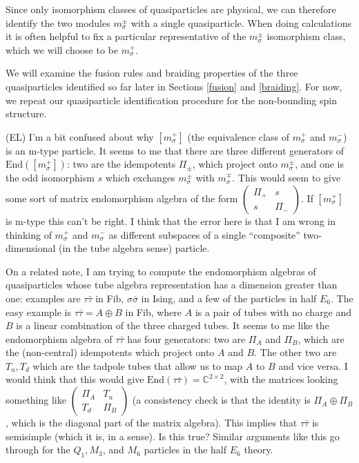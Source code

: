 \documentclass[12pt,a4paper]{article}
\newcommand{\cc}{\mathbb{C}}
\newcommand{\End}{\text{End}}
\newcommand{\ethan}[1]{{\color{amethyst}\footnotesize{(EL) #1}}}
\begin{document}
Since only isomorphism classes of quasiparticles are physical, we can therefore identify the 
two modules $m_\sigma^\pm$ with a single quasiparticle. 
When doing calculations it is often helpful to fix a particular representative of the $m_\sigma^\pm$ 
isomorphism class, which we will choose to be $m_\sigma^+$. 

We will examine the fusion rules and braiding properties of the three quasiparticles identified so 
far later in Sections \ref{fusion} and \ref{braiding}. 
For now, we repeat our quasiparticle identification procedure for the non-bounding spin structure.


\ethan{I'm a bit confused about why $[m^+_\sigma]$ (the equivalence class of $m^+_\sigma$ and 
$m_\sigma^-$) is an m-type particle. 
It seems to me that there are three different generators of $\End([m^+_\sigma])$: 
two are the idempotents $\Pi_\pm$, which project onto $m^\pm_\sigma$, and one is the 
odd isomorphism $s$ which exchanges $m^\pm_\sigma$ with $m^\mp_\sigma$. 
This would seem to give some sort of matrix endomorphism algebra of the form $\begin{pmatrix} \Pi_+ & s \\ s & \Pi_- \end{pmatrix}$. 
If $[m^+_\sigma]$ is m-type this can't be right. 
I think that the error here is that I am wrong in thinking of $m^+_\sigma$ and $m^-_\sigma$ 
as different subspaces of a single ``composite'' two-dimensional (in the tube algebra sense) particle. 

On a related note, I am trying to compute the endomorphism algebras of quasiparticles whose 
tube algebra representation has a dimension greater than one: examples are $\tau\bar\tau$ in 
Fib, $\sigma\bar\sigma$ in Ising, and a few of the particles in half $E_6$. 
The easy example is $\tau\bar\tau = A\oplus B$ in Fib, where $A$ is a pair of tubes with no 
charge and $B$ is a linear combination of the three charged tubes. 
It seems to me like the endomorphism algebra of $\tau\bar\tau$ has four generators: two are $\Pi_A$ 
and $\Pi_B$, which are the (non-central) idempotents which project onto $A$ and $B$. 
The other two are $T_u,T_d$ which are the tadpole tubes that allow us to map $A$ to $B$ and vice versa. 
I would think that this would give $\End(\tau\bar\tau) = \cc^{2\times2}$, with the 
matrices looking something like $\begin{pmatrix} \Pi_A & T_u \\ T_d & \Pi_B \end{pmatrix}$ 
(a consistency check is that the identity is $\Pi_A \oplus \Pi_B$, which is the diagonal 
part of the matrix algebra). 
This implies that $\tau\bar\tau$ is semisimple (which it is, in a sense). Is this true? 
Similar arguments like this go through for the $Q_1,M_3$, and $M_6$ particles in the half $E_6$ theory.}
\end{document}
